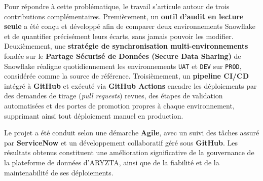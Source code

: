 Pour répondre à cette problématique, le travail s'articule autour de trois contributions complémentaires. Premièrement, un \textbf{outil d'audit en lecture seule} a été conçu et développé afin de comparer deux environnements Snowflake et de quantifier précisément leurs écarts, sans jamais pouvoir les modifier. Deuxièmement, une \textbf{stratégie de synchronisation multi-environnements} fondée sur le \textbf{Partage Sécurisé de Données (Secure Data Sharing)} de Snowflake réaligne quotidiennement les environnements \texttt{UAT} et \texttt{DEV} sur \texttt{PROD}, considérée comme la source de référence. Troisièmement, un \textbf{pipeline CI/CD} intégré à \textbf{GitHub} et exécuté via \textbf{GitHub Actions} encadre les déploiements par des demandes de tirage (\textit{pull requests}) revues, des étapes de validation automatisées et des portes de promotion propres à chaque environnement, supprimant ainsi tout déploiement manuel en production.

Le projet a été conduit selon une démarche \textbf{Agile}, avec un suivi des tâches assuré par \textbf{ServiceNow} et un développement collaboratif géré sous \textbf{GitHub}. Les résultats obtenus constituent une amélioration significative de la gouvernance de la plateforme de données d'ARYZTA, ainsi que de la fiabilité et de la maintenabilité de ses déploiements.

\newpage
